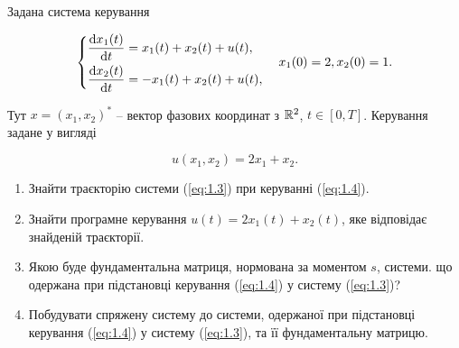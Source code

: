 \begin{problem}
	Задана система керування

	\begin{equation}
		\label{eq:1.3}
		\left\{
			\begin{aligned}
				\frac{\mathop{}\!\mathrm{d} x_1 (t)}{\mathop{}\!\mathrm{d} t} &= x_1 (t) + x_2 (t) + u (t), \\
				\frac{\mathop{}\!\mathrm{d} x_2 (t)}{\mathop{}\!\mathrm{d} t} &= - x_1 (t) + x_2 (t) + u(t),
			\end{aligned}
		\right.
		\quad
		x_1 (0) = 2, x_2 (0) = 1.
	\end{equation}

	Тут $x = (x_1, x_2)^*$ -- вектор фазових координат з $\mathbb{R}^2$, $t \in [0, T]$. Керування задане у вигляді

	\begin{equation}
		\label{eq:1.4}
		u(x_1, x_2) = 2 x_1 + x_2.
	\end{equation}

	\begin{enumerate}
		\item Знайти траєкторію системи (\ref{eq:1.3}) при керуванні (\ref{eq:1.4}).

		\item Знайти програмне керування $u(t) = 2 x_1 (t) + x_2 (t)$, яке відповідає знайденій траєкторії.

		\item Якою буде фундаментальна матриця, нормована за моментом $s$, системи. що одержана при підстановці керування (\ref{eq:1.4}) у систему (\ref{eq:1.3})?

		\item Побудувати спряжену систему до системи, одержаної при підстановці керування (\ref{eq:1.4}) у систему (\ref{eq:1.3}), та її фундаментальну матрицю.
	\end{enumerate}
\end{problem}

